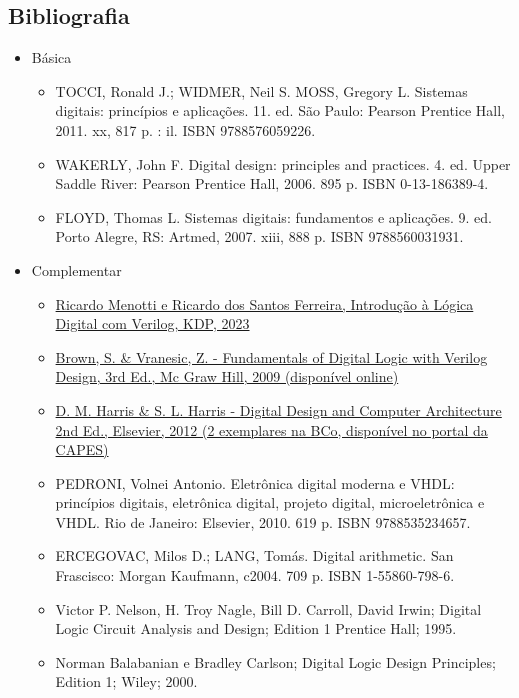 \subsection{Bibliografia} %

\begin{frame}[allowframebreaks]{\insertsubsection} 
	\begin{itemize}
		\item Básica
		\begin{itemize}
		    \item TOCCI, Ronald J.; WIDMER, Neil S. MOSS, Gregory L. Sistemas digitais: princípios e aplicações. 11. ed. São Paulo: Pearson Prentice Hall, 2011. xx, 817 p. : il. ISBN 9788576059226.
		    \item WAKERLY, John F. Digital design: principles and practices. 4. ed. Upper Saddle River: Pearson Prentice Hall, 2006. 895 p. ISBN 0-13-186389-4.
		    \item FLOYD, Thomas L. Sistemas digitais: fundamentos e aplicações. 9. ed. Porto Alegre, RS: Artmed, 2007. xiii, 888 p. ISBN 9788560031931.
		\end{itemize}
		\framebreak
		\item Complementar
		\begin{itemize}
                \item \href{https://a.co/d/4j7AOQ5}{Ricardo Menotti e Ricardo dos Santos Ferreira, Introdução à Lógica Digital com Verilog, KDP, 2023}
    	    \item \href{https://www.google.com.br/search?q=filetype\%3Apdf+Fundamentals+of+Digital+Logic+with+Verilog+Design+&oq=filetype\%3Apdf}{Brown, S. \& Vranesic, Z. - Fundamentals of Digital Logic with Verilog Design, 3rd Ed., Mc Graw Hill, 2009 (disponível online)}
        	\item \href{https://www.sciencedirect.com/science/book/9780123944245}{D. M. Harris \& S. L. Harris - Digital Design and Computer Architecture 2nd Ed., Elsevier, 2012 (2 exemplares na BCo, disponível no portal da CAPES)}
        	\framebreak
    		\item PEDRONI, Volnei Antonio. Eletrônica digital moderna e VHDL: princípios digitais, eletrônica digital, projeto digital, microeletrônica e VHDL. Rio de Janeiro: Elsevier, 2010. 619 p. ISBN 9788535234657.
            \item ERCEGOVAC, Milos D.; LANG, Tomás. Digital arithmetic. San Frascisco: Morgan Kaufmann, c2004. 709 p. ISBN 1-55860-798-6.
            \item Victor P. Nelson, H. Troy Nagle, Bill D. Carroll, David Irwin; Digital Logic Circuit Analysis and Design; Edition 1 
            Prentice Hall; 1995. 
            \item Norman Balabanian e Bradley Carlson; Digital Logic Design Principles; Edition 1; Wiley; 2000.
    	\end{itemize}
	\end{itemize}
\end{frame}

